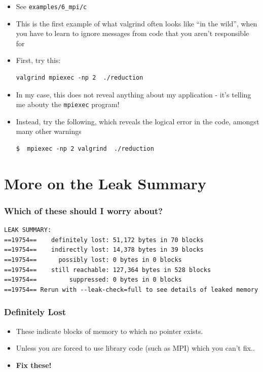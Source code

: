 \documentclass{beamer}
\begin{document}
\begin{frame}[fragile]
\frametitle{}
\begin{itemize}
\item See \texttt{examples/6\_mpi/c}
\item This is the first example of what valgrind often looks like ``in the wild'', when you have to learn to ignore messages from code that you aren't responsible for
\item First, try this:
\begin{lstlisting}
valgrind mpiexec -np 2  ./reduction
\end{lstlisting}
\item In my case, this does not reveal anything about my application - it's telling me abouty the \texttt{mpiexec} program!
\item Instead, try the following, which reveals the logical error in the code, amongst many other warnings
\begin{lstlisting}
$  mpiexec -np 2 valgrind  ./reduction
\end{lstlisting}
\end{itemize}
\end{frame}

\section{More on the Leak Summary}

\begin{frame}[fragile]
\frametitle{Which of these should I worry about?}
\begin{lstlisting}
LEAK SUMMARY:
==19754==    definitely lost: 51,172 bytes in 70 blocks
==19754==    indirectly lost: 14,378 bytes in 39 blocks
==19754==      possibly lost: 0 bytes in 0 blocks
==19754==    still reachable: 127,364 bytes in 528 blocks
==19754==         suppressed: 0 bytes in 0 blocks
==19754== Rerun with --leak-check=full to see details of leaked memory
\end{lstlisting}
\end{frame}

\begin{frame}[fragile]
  \frametitle{Definitely Lost}
  \begin{itemize}
    \item These indicate blocks of memory to which no pointer exists. 
    \item Unless you are forced to use library code (such as MPI) which you can't fix..
    \item \textbf{Fix these!}
  \end{itemize}
\end{frame}
\end{document}
